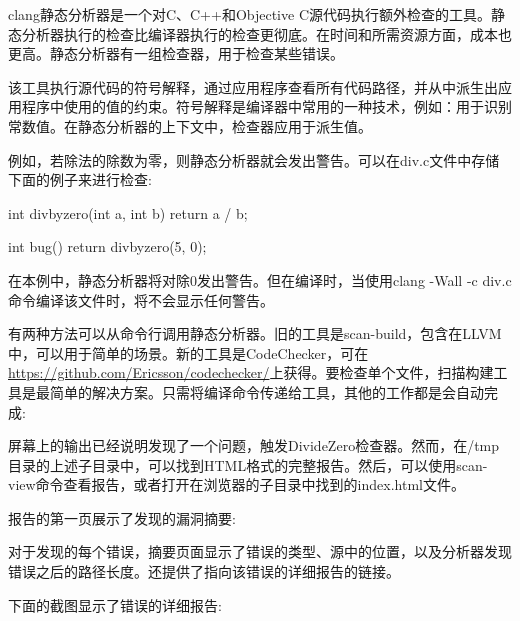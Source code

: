 
clang静态分析器是一个对C、C++和Objective C源代码执行额外检查的工具。静态分析器执行的检查比编译器执行的检查更彻底。在时间和所需资源方面，成本也更高。静态分析器有一组检查器，用于检查某些错误。

该工具执行源代码的符号解释，通过应用程序查看所有代码路径，并从中派生出应用程序中使用的值的约束。符号解释是编译器中常用的一种技术，例如：用于识别常数值。在静态分析器的上下文中，检查器应用于派生值。

例如，若除法的除数为零，则静态分析器就会发出警告。可以在div.c文件中存储下面的例子来进行检查:

\begin{cpp}
int divbyzero(int a, int b) { return a / b; }

int bug() { return divbyzero(5, 0); }
\end{cpp}

在本例中，静态分析器将对除0发出警告。但在编译时，当使用clang -Wall -c div.c命令编译该文件时，将不会显示任何警告。

有两种方法可以从命令行调用静态分析器。旧的工具是scan-build，包含在LLVM中，可以用于简单的场景。新的工具是CodeChecker，可在\url{https://github.com/Ericsson/codechecker/}上获得。要检查单个文件，扫描构建工具是最简单的解决方案。只需将编译命令传递给工具，其他的工作都是会自动完成:


屏幕上的输出已经说明发现了一个问题，触发DivideZero检查器。然而，在/tmp目录的上述子目录中，可以找到HTML格式的完整报告。然后，可以使用scan-view命令查看报告，或者打开在浏览器的子目录中找到的index.html文件。

报告的第一页展示了发现的漏洞摘要:


对于发现的每个错误，摘要页面显示了错误的类型、源中的位置，以及分析器发现错误之后的路径长度。还提供了指向该错误的详细报告的链接。

下面的截图显示了错误的详细报告:



